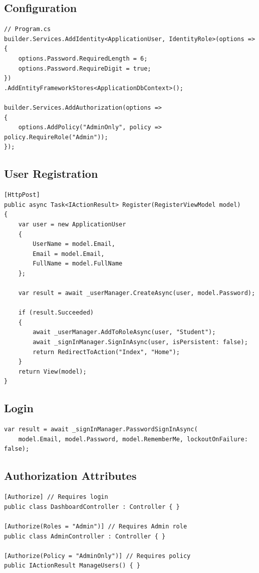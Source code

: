 \documentclass[10pt,a4paper]{article}
\begin{document}
\subsection*{Configuration}
\begin{lstlisting}[basicstyle=\ttfamily\tiny]
// Program.cs
builder.Services.AddIdentity<ApplicationUser, IdentityRole>(options =>
{
    options.Password.RequiredLength = 6;
    options.Password.RequireDigit = true;
})
.AddEntityFrameworkStores<ApplicationDbContext>();

builder.Services.AddAuthorization(options =>
{
    options.AddPolicy("AdminOnly", policy => policy.RequireRole("Admin"));
});
\end{lstlisting}

\subsection*{User Registration}
\begin{lstlisting}[basicstyle=\ttfamily\tiny]
[HttpPost]
public async Task<IActionResult> Register(RegisterViewModel model)
{
    var user = new ApplicationUser
    {
        UserName = model.Email,
        Email = model.Email,
        FullName = model.FullName
    };
    
    var result = await _userManager.CreateAsync(user, model.Password);
    
    if (result.Succeeded)
    {
        await _userManager.AddToRoleAsync(user, "Student");
        await _signInManager.SignInAsync(user, isPersistent: false);
        return RedirectToAction("Index", "Home");
    }
    return View(model);
}
\end{lstlisting}

\subsection*{Login}
\begin{lstlisting}[basicstyle=\ttfamily\tiny]
var result = await _signInManager.PasswordSignInAsync(
    model.Email, model.Password, model.RememberMe, lockoutOnFailure: false);
\end{lstlisting}

\subsection*{Authorization Attributes}
\begin{lstlisting}[basicstyle=\ttfamily\tiny]
[Authorize] // Requires login
public class DashboardController : Controller { }

[Authorize(Roles = "Admin")] // Requires Admin role
public class AdminController : Controller { }

[Authorize(Policy = "AdminOnly")] // Requires policy
public IActionResult ManageUsers() { }
\end{lstlisting}
\end{document}
